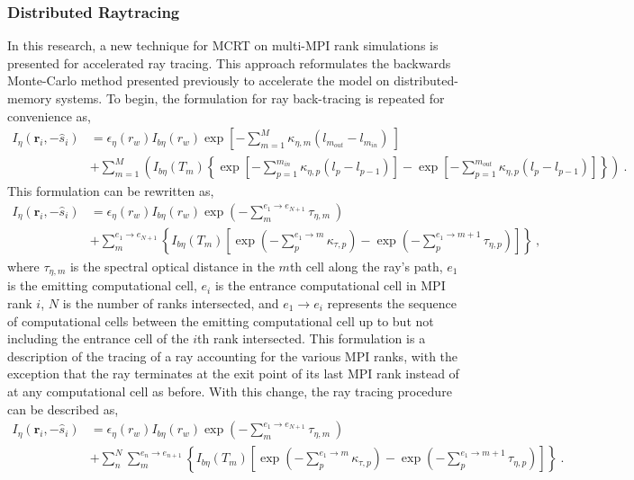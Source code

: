 \subsubsection{Distributed Raytracing}
In this research, a new technique for MCRT on multi-MPI rank simulations is presented for accelerated ray tracing. This approach reformulates the backwards Monte-Carlo method presented previously to accelerate the model on distributed-memory systems.
To begin, the formulation for ray back-tracing is repeated for convenience as,
\begin{equation}
    \begin{aligned}
    I_\eta{}(\textbf{r}_i,-\hat{s}_i)& = \epsilon{}_\eta{}(r_w)I_{b\eta{}}(r_w)\exp{\left[-\sum_{m=1}^M\kappa{}_{\eta{},m}(l_{m_{out}}-l_{m_{in}})~\right]}\\
    &+\sum_{m=1}^M\left( I_{b\eta}(T_m)\left\{ \exp{\left[-\sum_{p=1}^{m_{in}}\kappa{}_{\eta{},p}(l_{p}-l_{p-1})\right]}- \exp{\left[-\sum_{p=1}^{m_{out}}\kappa{}_{\eta{},p}(l_{p}-l_{p-1})\right]} \right\} \right)~.
    \end{aligned}
\end{equation}
This formulation can be rewritten as,
\begin{equation}
    \begin{aligned}
    I_\eta{}(\textbf{r}_i,-\hat{s}_i)& = \epsilon{}_\eta{}(r_w)I_{b\eta{}}(r_w)\exp{\left(-\sum_{m}^{e_1\rightarrow{}e_{N+1}}\tau{}_{\eta{},m}~\right)}\\
    &+\sum_{m}^{e_1\rightarrow{}e_{N+1}}\left\{ I_{b\eta}(T_m)\left[ \exp{\left(-\sum_{p}^{e_1\rightarrow{}m}\kappa{}_{\tau{},p}\right)}- \exp{\left(-\sum_{p}^{e_1\rightarrow{}m+1}\tau{}_{\eta{},p}\right)} \right] \right\}~,
    \end{aligned}
\end{equation}
where $\tau{}_{\eta{},m}$ is the spectral optical distance in the $m$th cell along the ray's path, $e_1$ is the emitting computational cell, $e_i$  is the entrance computational cell in MPI rank $i$, $N$ is the number of ranks intersected, and $e_1\rightarrow{}e_i$ represents the sequence of computational cells between the emitting computational cell up to but not including the entrance cell of the $i$th rank intersected. This formulation is a description of the tracing of a ray accounting for the various MPI ranks, with the exception that the ray terminates at the exit point of its last MPI rank instead of at any computational cell as before. With this change, the ray tracing procedure can be described as,
\begin{equation}
    \begin{aligned}
    I_\eta{}(\textbf{r}_i,-\hat{s}_i)& = \epsilon{}_\eta{}(r_w)I_{b\eta{}}(r_w)\exp{\left(-\sum_{m}^{e_1\rightarrow{}e_{N+1}}\tau{}_{\eta{},m}~\right)}\\
    &+\sum_{n}^{N}\sum_{m}^{e_n\rightarrow{}e_{n+1}}\left\{ I_{b\eta}(T_m)\left[ \exp{\left(-\sum_{p}^{e_1\rightarrow{}m}\kappa{}_{\tau{},p}\right)}- \exp{\left(-\sum_{p}^{e_1\rightarrow{}m+1}\tau{}_{\eta{},p}\right)} \right] \right\}~.
    \end{aligned}
\end{equation}
